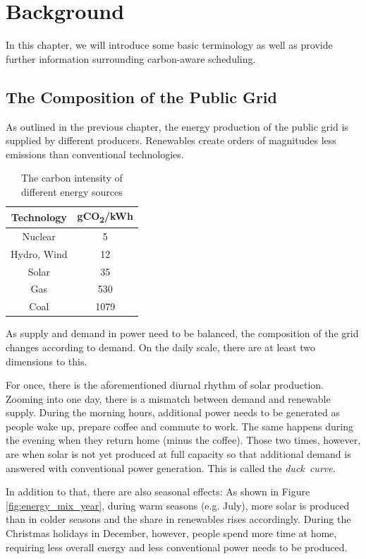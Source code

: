 \chapter{Background}
\label{chap:backgroud}

In this chapter, we will introduce some basic terminology as well as provide further information surrounding carbon-aware scheduling.

\section{The Composition of the Public Grid}

As outlined in the previous chapter, the energy production of the public grid is supplied by different producers.
Renewables create orders of magnitudes less emissions than conventional technologies.  

\begin{table}[h!]
    \centering
    \begin{tabular}{|c|c|}
    \hline
        Technology & gCO\textsubscript{2}/kWh \\ \hline
        Nuclear & 5 \\ \hline
        Hydro, Wind & 12 \\ \hline
        Solar & 35 \\ \hline
        Gas & 530 \\ \hline
        Coal & 1079 \\ \hline
    \end{tabular}
    \caption{The carbon intensity of different energy sources }
    \label{tab:carbon_intensities}
\end{table}

As supply and demand in power need to be balanced, the composition of the grid changes according to demand.
On the daily scale, there are at least two dimensions to this. 

For once, there is the aforementioned diurnal rhythm of solar production.
Zooming into one day, there is a mismatch between demand and renewable supply.
During the morning hours, additional power needs to be generated as people wake up, prepare coffee and commute to work.
The same happens during the evening when they return home (minus the coffee).
Those two times, however, are when solar is not yet produced at full capacity so that additional demand is answered with conventional power generation.
This is called the \emph{duck~curve}.

In addition to that, there are also seasonal effects:
As shown in Figure \ref{fig:energy_mix_year}, during warm seasons (e.g. July), more solar is produced than in colder seasons and the share in renewables rises accordingly.
During the Christmas holidays in December, however, people spend more time at home, requiring less overall energy and less conventional power needs to be produced.

